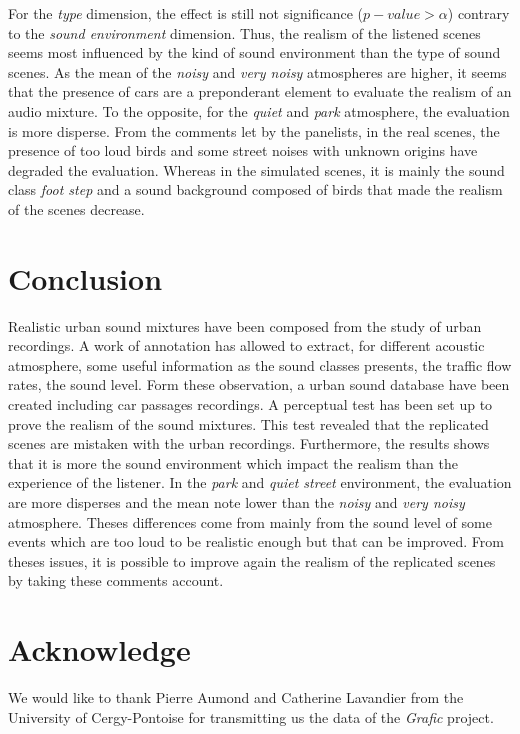 \documentclass[a4,11pt,twocolumn]{article}
\begin{document}
For the \textit{type} dimension, the effect is still not significance ($p-value > \alpha$) contrary to the \textit{sound environment} dimension. Thus, the realism of the listened scenes seems most influenced by the kind of sound environment than the type of sound scenes. As the mean of the \textit{noisy} and \textit{very noisy} atmospheres are higher, it seems that the presence of cars are a preponderant element to evaluate the realism of an audio mixture. To the opposite, for the \textit{quiet} and \textit{park} atmosphere, the evaluation is more disperse. From the comments let by the panelists, in the real scenes, the presence of too loud birds and some street noises with unknown origins have degraded the evaluation. Whereas in the simulated scenes, it is mainly the sound class \textit{foot step} and a sound background composed of birds that made the realism of the scenes decrease. \\

\section*{Conclusion}
Realistic urban sound mixtures have been composed from the study of urban recordings. A work of annotation has allowed to extract, for different acoustic atmosphere, some useful information as the sound classes presents, the traffic flow rates, the sound level. Form these observation, a urban sound database have been created including car passages recordings. A perceptual test has been set up to prove the realism of the sound mixtures. This test revealed that the replicated scenes are mistaken with the urban recordings. Furthermore, the results shows that it is more the sound environment which impact the realism than the experience of the listener. In the \textit{park} and \textit{quiet street} environment, the evaluation are more disperses and the mean note lower than the \textit{noisy} and \textit{very noisy} atmosphere. Theses differences come from mainly from the sound level of some events which are too loud to be realistic enough but that can be improved. From theses issues, it is possible to improve again the realism  of the replicated scenes by taking these comments account.

\section*{Acknowledge}
We would like to thank Pierre Aumond and Catherine Lavandier from the University of Cergy-Pontoise for transmitting us the data of the \textit{Grafic} project. 



\end{document}
